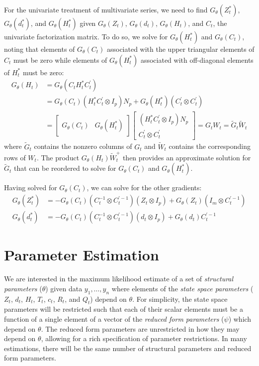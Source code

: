 \documentclass[12pt]{article}
\newcommand{\Gt}{G_\theta}
\begin{document}
	For the univariate treatment of multivariate series, we need to find $\Gt(Z_t^*)$, $\Gt(d_t^*)$, and $\Gt(H_t^*)$ given $\Gt(Z_t)$, $\Gt(d_t)$, $\Gt(H_t)$, and $C_t$, the univariate factorization matrix. To do so, we  solve for $\Gt(H_t^*)$ and $\Gt(C_t)$, noting that elements of $\Gt(C_t)$ associated with the upper triangular elements of $C_t$ must be zero while elements of $\Gt(H_t^*)$ associated with off-diagonal elements of $H_t^*$ must be zero: 
	\begin{align*}
	\Gt(H_t) &= \Gt(C_t H_t^* C_t^\prime) \\
	&= \Gt(C_t)(H_t^* C_t^\prime \otimes I_p) N_p + \Gt(H_t^*)(C_t^\prime \otimes C_t^\prime) \\
	&= \begin{bmatrix} \Gt(C_t) & \Gt(H_t^*) \end{bmatrix} \begin{bmatrix} (H_t^* C_t^\prime \otimes I_p) N_p \\ C_t^\prime \otimes C_t^\prime \end{bmatrix} 
	= G_t W_t
	= \tilde{G}_t \tilde{W}_t
	\end{align*}
	where $\tilde{G}_t$ contains the nonzero columns of $G_t$ and $\tilde{W}_t$ contains the corresponding rows of $W_t$. The product $\Gt(H_t) \tilde{W}_t^+$ then provides an approximate solution for $\tilde{G}_t$ that can be reordered to solve for $\Gt(C_t)$ and $\Gt(H_t^*)$.

	Having solved for $\Gt(C_t)$, we can solve for the other gradients: 
	\begin{align*} 
	\Gt(Z_t^*) &= -\Gt(C_t)(C_t^{-1} \otimes C_t^{\prime-1})(Z_t \otimes I_p) + \Gt(Z_t)(I_m \otimes C_t^{\prime-1}) \\
	\Gt(d_t^*) &= -\Gt(C_t)(C_t^{-1} \otimes C_t^{\prime-1})(d_t \otimes I_p) + \Gt(d_t)C_t^{\prime-1}
	\end{align*}

\newpage
\section{Parameter Estimation}
	\label{sec:parameter_estimation}
	We are interested in the maximum likelihood estimate of a set of \emph{structural parameters} ($\theta$) given data $y_1, \dots, y_n$ where elements of the \emph{state space parameters} ($Z_t$, $d_t$, $H_t$, $T_t$, $c_t$, $R_t$, and $Q_t$) depend on $\theta$. For simplicity, the state space parameters will be restricted such that each of their scalar elements must be a function of a single element of a vector of the \emph{reduced form parameters} ($\psi$) which depend on $\theta$. The reduced form parameters are unrestricted in how they may depend on $\theta$, allowing for a rich specification of parameter restrictions. In many estimations, there will be the same number of structural parameters and reduced form parameters. 
\end{document}
